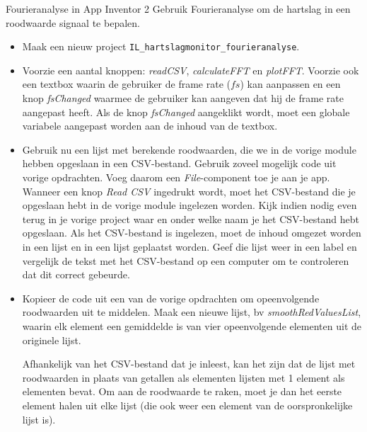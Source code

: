 \begin{opdracht}{Fourieranalyse in App Inventor 2}
Gebruik Fourieranalyse om de hartslag in een roodwaarde signaal te bepalen.
	
\begin{itemize}
	
	\item Maak een nieuw project \texttt{IL\_hartslagmonitor\_fourieranalyse}.
	
	\item Voorzie een aantal knoppen: \emph{readCSV}, \emph{calculateFFT} en \emph{plotFFT}. Voorzie ook een textbox waarin de gebruiker de frame rate ($fs$) kan aanpassen en een knop \emph{fsChanged} waarmee de gebruiker kan aangeven dat hij de frame rate aangepast heeft. Als de knop \emph{fsChanged} aangeklikt wordt, moet een globale variabele aangepast worden aan de inhoud van de textbox.
	
	\item Gebruik nu een lijst met berekende roodwaarden, die we in de vorige module hebben opgeslaan in een CSV-bestand. Gebruik zoveel mogelijk code uit vorige opdrachten. Voeg daarom een \emph{File}-component toe je aan je app. Wanneer een knop \emph{Read CSV} ingedrukt wordt, moet het CSV-bestand die je opgeslaan hebt in de vorige module ingelezen worden. Kijk indien nodig even terug in je vorige project waar en onder welke naam je het CSV-bestand hebt opgeslaan. Als het CSV-bestand is ingelezen, moet de inhoud omgezet worden in een lijst en in een lijst geplaatst worden. Geef die lijst weer in een label en vergelijk de tekst met het CSV-bestand op een computer om te controleren dat dit correct gebeurde. 
	
	\item Kopieer de code uit een van de vorige opdrachten om opeenvolgende roodwaarden uit te middelen. Maak een nieuwe lijst, bv \emph{smoothRedValuesList}, waarin elk element een gemiddelde is van vier opeenvolgende elementen uit de originele lijst. 
	
	\begin{opmerking}
		Afhankelijk van het CSV-bestand dat je inleest, kan het zijn dat de lijst met roodwaarden in plaats van getallen als elementen lijsten met 1 element als elementen bevat. Om aan de roodwaarde te raken, moet je dan het eerste element halen uit elke lijst (die ook weer een element van de oorspronkelijke lijst is).
		
	\end{opmerking}
	

\end{itemize}
\end{opdracht}
